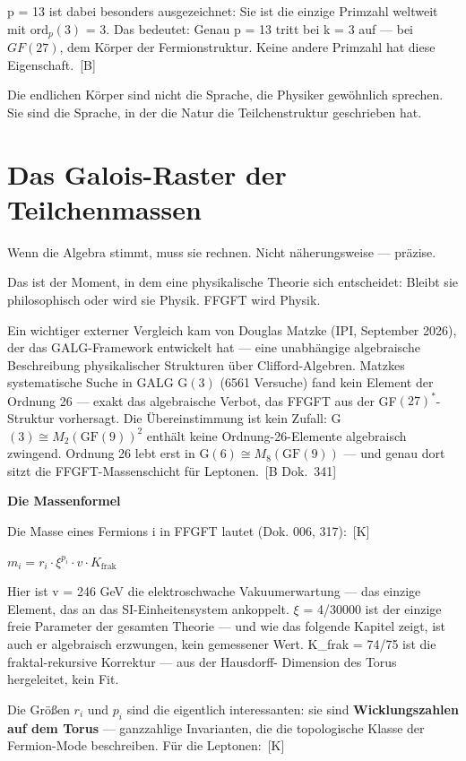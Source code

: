 \documentclass[11pt,oneside]{book}
\newcommand{\status}[1]{\penalty10000\,{\scriptsize\textcolor{gray!60}{[#1]}}}
\begin{document}
p = 13 ist dabei besonders ausgezeichnet: Sie ist die einzige Primzahl
weltweit mit $\text{ord}_p(3)$ = 3. Das bedeutet: Genau p = 13 tritt bei k = 3
auf — bei $GF(27)$, dem Körper der Fermionstruktur. Keine andere Primzahl
hat diese Eigenschaft. \status{B}


Die endlichen Körper sind nicht die Sprache, die Physiker gewöhnlich
sprechen. Sie sind die Sprache, in der die Natur die Teilchenstruktur
geschrieben hat.








\chapter{Das Galois-Raster der Teilchenmassen}

Wenn die Algebra stimmt, muss sie rechnen. Nicht näherungsweise — präzise.

Das ist der Moment, in dem eine physikalische Theorie sich entscheidet:
Bleibt sie philosophisch oder wird sie Physik. FFGFT wird Physik.

Ein wichtiger externer Vergleich kam von Douglas Matzke (IPI, September
2026), der das GALG-Framework entwickelt hat --- eine unabhängige
algebraische Beschreibung physikalischer Strukturen über Clifford-Algebren.
Matzkes systematische Suche in GALG G$(3)$ (6561 Versuche) fand kein
Element der Ordnung 26 --- exakt das algebraische Verbot, das FFGFT aus
der GF$(27)^*$-Struktur vorhersagt. Die Übereinstimmung ist kein
Zufall: G$(3) \cong M_2(\text{GF}(9))^2$ enthält keine Ordnung-26-Elemente
algebraisch zwingend. Ordnung 26 lebt erst in G$(6) \cong M_8(\text{GF}(9))$
--- und genau dort sitzt die FFGFT-Massenschicht für Leptonen. \status{B Dok.~341}

\textbf{Die Massenformel}


Die Masse eines Fermions i in FFGFT lautet (Dok. 006, 317): \status{K}


$m_i = r_i \cdot \xi^{p_i} \cdot v \cdot K_\text{frak}$


Hier ist v = 246 GeV die elektroschwache Vakuumerwartung — das einzige
Element, das an das SI-Einheitensystem ankoppelt. $\xi$ = 4/30000 ist der
einzige freie Parameter der gesamten Theorie — und wie das folgende
Kapitel zeigt, ist auch er algebraisch erzwungen, kein gemessener Wert.
K\_frak = 74/75 ist die fraktal-rekursive Korrektur — aus der Hausdorff-
Dimension des Torus hergeleitet, kein Fit.


Die Größen $r_i$ und $p_i$ sind die eigentlich interessanten: sie sind
\textbf{Wicklungszahlen auf dem Torus} — ganzzahlige Invarianten, die die
topologische Klasse der Fermion-Mode beschreiben. Für die Leptonen: \status{K}
\end{document}
